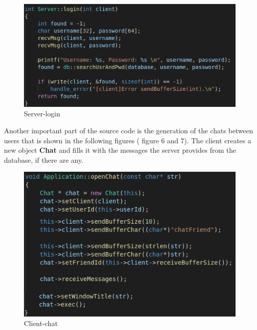 \documentclass[runningheads]{llncs}
\begin{document}
\newpage 
\begin{figure}[H]
\begin{center}
\includegraphics[]{images/server-login.png}
\caption{Server-login}
\end{center}
\end{figure}

\par Another important part of the source code is the generation of the chats between users that is shown in the following figures ( figure 6 and 7). The client creates a new object \textbf{Chat} and fills it with the messages the server provides from the database, if there are any. 

\begin{figure}[H]
\begin{center}
\includegraphics[]{images/client-chat.png}
\caption{Client-chat}
\end{center}
\end{figure}

\newpage
\end{document}
